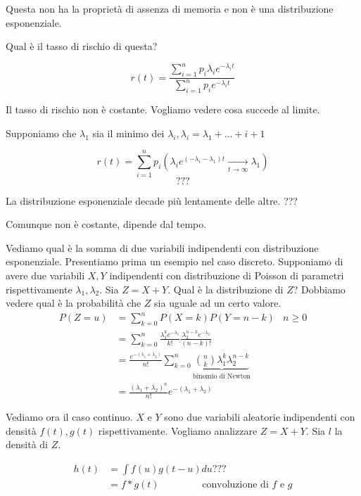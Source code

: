 \documentclass[a4paper,12pt]{book}
\begin{document}
Questa non ha la proprietà di assenza di memoria e non è una distribuzione esponenziale. 



Qual è il tasso di rischio di questa? %

$$ r(t) = \frac{\sum_{i = 1}^{n} p_i \lambda_i e^{-\lambda_i t}}{\sum_{i = 1}^{n} p_i e^{-\lambda_i t}} $$

Il tasso di rischio non è costante. Vogliamo vedere cosa succede al limite. 

Supponiamo che $\lambda_1$ sia il minimo dei $\lambda_i, \lambda_i = \lambda_1 + ... + i + 1$ %

$$ r(t) = \sum_{i = 1}^{n} p_i(\lambda_i e ^{(-\lambda_i - \lambda_1) t } \underset{t \to \infty}{\longrightarrow} \lambda_1) $$
$$ ??? $$ %

La distribuzione esponenziale decade più lentamente delle altre. ??? %

Comunque non è costante, dipende dal tempo. 

Vediamo qual è la somma di due variabili indipendenti con distribuzione esponenziale. Presentiamo prima un esempio nel caso discreto. Supponiamo di avere due variabili $ X, Y $ indipendenti con distribuzione di Poisson di parametri rispettivamente $\lambda_1, \lambda_2$. Sia $ Z = X + Y $. Qual è la distribuzione di $ Z $? Dobbiamo vedere qual è la probabilità che $ Z $ sia uguale ad un certo valore. 
\begin{align*}
	P(Z = u) & = \sum_{k = 0}^{n} P(X = k)P(Y = n-k) & n \ge 0 \\
	& = \sum_{k=0}^{n} \frac{\lambda_1^k e^{-\lambda_1}} {k!} \frac{\lambda_2^{n-k} e^{-\lambda_2}}{(n-k)!} \\
	& = \frac{e^{-(\lambda_1 + \lambda_2)}}{n!} \sum_{k=0}^{n} \underbrace{\binom{n}{k} \lambda_1^k \lambda_2^{n-k}}_{\text{binomio di Newton}} \\
	& = \frac{(\lambda_1 + \lambda_2)^n}{n!} e^{-(\lambda_1 + \lambda_2)}
\end{align*}

Vediamo ora il caso continuo. $ X $ e $ Y $ sono due variabili aleatorie indipendenti con densità $ f(t), g(t) $ rispettivamente. Vogliamo analizzare $ Z = X + Y$. Sia $ l $ la densità di $ Z $. 

\begin{align*}
	h(t) & = \int f(u) g(t-u) du ??? \\%
	& = f * g(t) \qquad \qquad \text{ convoluzione di } f \text{ e } g
\end{align*}
\end{document}
